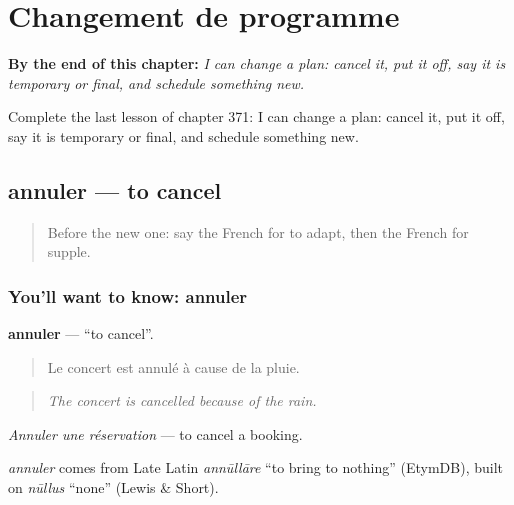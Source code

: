 
\chapter{Changement de programme}
\label{ch:fr-changement-de-programme}

\begin{chapteropening}
\textbf{By the end of this chapter:} \emph{I can change a plan: cancel it, put it off, say it is temporary or final, and schedule something new.}

Complete the last lesson of chapter 371: I can change a plan: cancel it, put it off, say it is temporary or final, and schedule something new.
\end{chapteropening}

\section[annuler]{annuler — to cancel}

\label{lesson:FR-C371-annuler}



\begin{quote}
Before the new one: say the French for to adapt, then the French for supple.
\end{quote}

\subsection*{You'll want to know: annuler}
\textbf{annuler} — \textquotedblleft{}to cancel\textquotedblright{}.

\begin{quote}
Le concert est annulé à cause de la pluie.
\end{quote}

\begin{quote}
\emph{The concert is cancelled because of the rain.}
\end{quote}

\emph{Annuler une réservation} — to cancel a booking.

\begin{cousinweb}
\emph{annuler} comes from Late Latin \emph{annūllāre} \textquotedblleft{}to bring to nothing\textquotedblright{} (EtymDB), built on \emph{nūllus} \textquotedblleft{}none\textquotedblright{} (Lewis \& Short).
\end{cousinweb}

